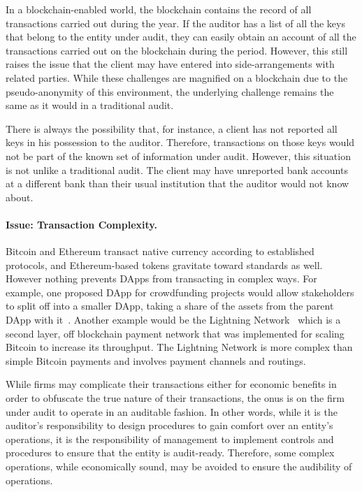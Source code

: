In a blockchain-enabled world, the blockchain contains the record of all transactions carried out during the year. If the auditor has a list of all the keys that belong to the entity under audit, they can easily obtain an account of all the transactions carried out on the blockchain during the period. However, this still raises the issue that the client may have entered into side-arrangements with related parties. While these challenges are magnified on a blockchain due to the pseudo-anonymity of this environment, the underlying challenge remains the same as it would in a traditional audit.

There is always the possibility that, for instance, a client has not reported all keys in his possession to the auditor. Therefore, transactions on those keys would not be part of the known set of information under audit. However, this situation is not unlike a traditional audit. The client may have unreported bank accounts at a different bank than their usual institution that the auditor would not know about. 

\paragraph{Issue: Transaction Complexity.} Bitcoin and Ethereum transact native currency according to established protocols, and Ethereum-based tokens gravitate toward standards as well. However nothing prevents DApps from transacting in complex ways. For example, one proposed DApp for crowdfunding projects would allow stakeholders to split off into a smaller DApp, taking a share of the assets from the parent DApp with it~\cite{dupont2017experiments}. Another example would be the Lightning Network~\cite{poon2016bitcoin} which is a second layer, off blockchain payment network that was implemented for scaling Bitcoin to increase its throughput. The Lightning Network is more complex than simple Bitcoin payments and involves payment channels and routings.
 
While firms may complicate their transactions either for economic benefits in order to obfuscate the true nature of their transactions, the onus is on the firm under audit to operate in an auditable fashion. In other words, while it is the auditor{'}s responsibility to design procedures to gain comfort over an entity{'}s operations, it is the responsibility of management to implement controls and procedures to ensure that the entity is audit-ready. Therefore, some complex operations, while economically sound, may be avoided to ensure the audibility of operations. 

